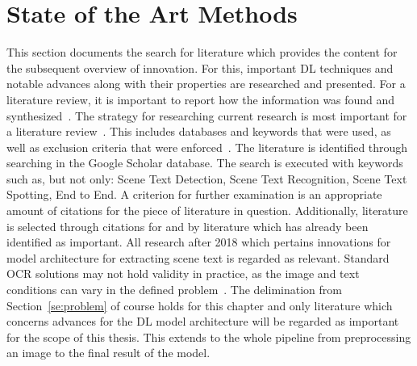 \section{State of the Art Methods}\label{se:innovations}
This section documents the search for literature which provides the content for the subsequent
overview of innovation.
For this, important \ac{DL} techniques and notable advances along with their properties are researched
and presented.
For a literature review, it is important to report how the information was found and
synthesized~\citep{torraco_writing_2005}.
The strategy for researching current research is most important for a literature
review~\citep{snyder_literature_2019}.
This includes databases and keywords that were used, as well as exclusion criteria that were
enforced~\citep{torraco_writing_2005}.
The literature is identified through searching in the Google Scholar database.
The search is executed with keywords such as, but not only: Scene Text Detection,
Scene Text Recognition, Scene Text Spotting, End to End.
A criterion for further examination is an appropriate amount of citations for the piece of
literature in question.
Additionally, literature is selected through citations for and by literature which has already been
identified as important.
All research after 2018 which pertains innovations for model architecture for extracting scene
text is regarded as relevant.
Standard \ac{OCR} solutions may not hold validity in practice, as the image and text conditions can
vary in the defined problem~\citep{chen_text_2021}.
The delimination from Section~\ref{se:problem} of course holds for this chapter and only literature
which concerns advances for the \ac{DL} model architecture will be regarded as important for the
scope of this thesis.
This extends to the whole pipeline from preprocessing an image to the final result of the model.


